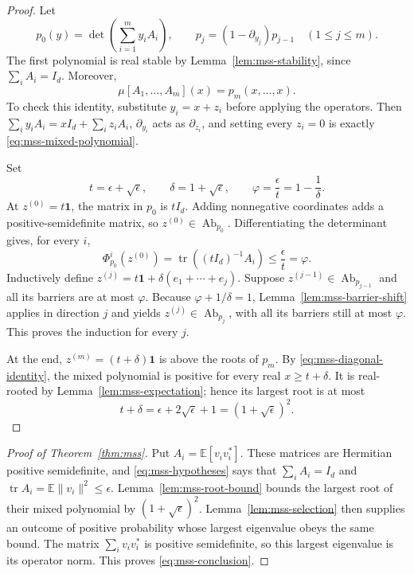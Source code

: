 \documentclass[11pt]{amsart}
\theoremstyle{definition}
\theoremstyle{remark}
\numberwithin{equation}{section}
\begin{document}
\begin{proof}
Let
\[
 p_0(y)=\det\left(\sum_{i=1}^m y_iA_i\right),
 \qquad
 p_j=(1-\partial_{y_j})p_{j-1}\quad(1\leq j\leq m).
\]
The first polynomial is real stable by
Lemma~\ref{lem:mss-stability}, since $\sum_iA_i=I_d$.
Moreover,
\begin{equation}
 \mu[A_1,\ldots,A_m](x)=p_m(x,\ldots,x).
 \label{eq:mss-diagonal-identity}
\end{equation}
To check this identity, substitute $y_i=x+z_i$ before applying the
operators.  Then $\sum_i y_iA_i=xI_d+\sum_i z_iA_i$,
$\partial_{y_i}$ acts as $\partial_{z_i}$, and setting every $z_i=0$
is exactly \eqref{eq:mss-mixed-polynomial}.

Set
\[
 t=\epsilon+\sqrt\epsilon,
 \qquad \delta=1+\sqrt\epsilon,
 \qquad \varphi=\frac\epsilon t=1-\frac1\delta.
\]
At $z^{(0)}=t\mathbf1$, the matrix in $p_0$ is $tI_d$.
Adding nonnegative coordinates adds a positive-semidefinite matrix,
so $z^{(0)}\in\operatorname{Ab}_{p_0}$.
Differentiating the determinant gives, for every $i$,
\[
 \Phi_{p_0}^i(z^{(0)})
 =\operatorname{tr}((tI_d)^{-1}A_i)
 \leq\frac\epsilon t=\varphi.
\]
Inductively define
$z^{(j)}=t\mathbf1+\delta(e_1+\cdots+e_j)$.
Suppose $z^{(j-1)}\in\operatorname{Ab}_{p_{j-1}}$ and all its
barriers are at most $\varphi$.
Because $\varphi+1/\delta=1$, Lemma~\ref{lem:mss-barrier-shift}
applies in direction $j$ and yields
$z^{(j)}\in\operatorname{Ab}_{p_j}$, with all its barriers still
at most $\varphi$.  This proves the induction for every $j$.

At the end, $z^{(m)}=(t+\delta)\mathbf1$ is above the roots of
$p_m$.  By \eqref{eq:mss-diagonal-identity}, the mixed polynomial
is positive for every real $x\geq t+\delta$.
It is real-rooted by Lemma~\ref{lem:mss-expectation}; hence its
largest root is at most
\[
 t+\delta=\epsilon+2\sqrt\epsilon+1
          =(1+\sqrt\epsilon)^2.
\]
\end{proof}

\begin{proof}[Proof of Theorem~\ref{thm:mss}]
Put $A_i=\mathbb E[v_iv_i^*]$.  These matrices are Hermitian
positive semidefinite, and \eqref{eq:mss-hypotheses} says that
$\sum_iA_i=I_d$ and
$\operatorname{tr}A_i=\mathbb E\|v_i\|^2\leq\epsilon$.
Lemma~\ref{lem:mss-root-bound} bounds the largest root of their
mixed polynomial by $(1+\sqrt\epsilon)^2$.
Lemma~\ref{lem:mss-selection} then supplies an outcome of positive
probability whose largest eigenvalue obeys the same bound.
The matrix $\sum_i v_iv_i^*$ is positive semidefinite, so this
largest eigenvalue is its operator norm.  This proves
\eqref{eq:mss-conclusion}.
\end{proof}
\end{document}
